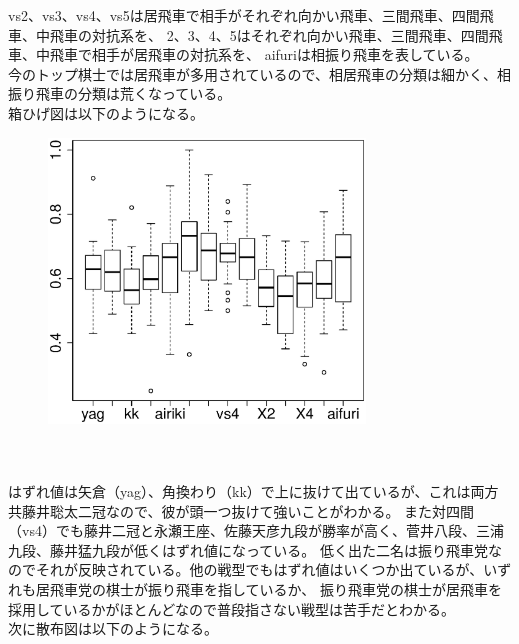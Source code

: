 \documentclass[11pt,a4paper,dvipdfmx]{jsarticle}
\begin{document}
vs2、vs3、vs4、vs5は居飛車で相手がそれぞれ向かい飛車、三間飛車、四間飛車、中飛車の対抗系を、
2、3、4、5はそれぞれ向かい飛車、三間飛車、四間飛車、中飛車で相手が居飛車の対抗系を、
aifuriは相振り飛車を表している。
\\
今のトップ棋士では居飛車が多用されているので、相居飛車の分類は細かく、相振り飛車の分類は荒くなっている。
\\
箱ひげ図は以下のようになる。
\begin{figure}[h]
    \centering
    \includegraphics[width=0.75\textwidth]{graph/boxplot-raw.eps}
\end{figure}
\\
\\
はずれ値は矢倉（yag）、角換わり（kk）で上に抜けて出ているが、これは両方共藤井聡太二冠なので、彼が頭一つ抜けて強いことがわかる。
また対四間（vs4）でも藤井二冠と永瀬王座、佐藤天彦九段が勝率が高く、菅井八段、三浦九段、藤井猛九段が低くはずれ値になっている。
低く出た二名は振り飛車党なのでそれが反映されている。他の戦型でもはずれ値はいくつか出ているが、いずれも居飛車党の棋士が振り飛車を指しているか、
振り飛車党の棋士が居飛車を採用しているかがほとんどなので普段指さない戦型は苦手だとわかる。
\\
次に散布図は以下のようになる。
\end{document}
